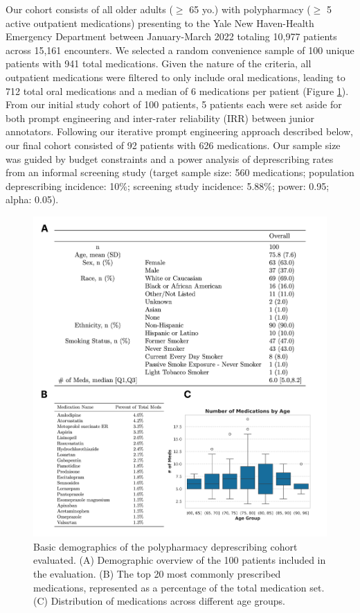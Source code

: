 Our cohort consists of all older adults ($\geq$ 65 yo.) with polypharmacy ($\geq$ 5 active outpatient medications) presenting to the Yale New Haven-Health Emergency Department between January-March 2022 totaling 10,977 patients across 15,161 encounters. We selected a random convenience sample of 100 unique patients with 941 total medications. Given the nature of the criteria, all outpatient medications were filtered to only include oral medications, leading to 712 total oral medications and a median of 6 medications per patient (Figure \ref{fig:aim1-demographics}). From our initial study cohort of 100 patients, 5 patients each were set aside for both prompt engineering and inter-rater reliability (IRR) between junior annotators. Following our iterative prompt engineering approach described below, our final cohort consisted of 92 patients with 626 medications. Our sample size was guided by budget constraints and a power analysis of deprescribing rates from an informal screening study (target sample size: 560 medications; population deprescribing incidence: 10\%\citep{garfinkelWarPolypharmacyNew2007}; screening study incidence: 5.88\%\citep{SAEM24Abstracts2024}; power: 0.95; alpha: 0.05). 

\begin{figure}[!htbp]
	\centering
	\includegraphics[width=1\textwidth] {figures/aim1/combined_fig.png}
	\caption{Basic demographics of the polypharmacy deprescribing cohort evaluated. (A) Demographic overview of the 100 patients included in the evaluation. (B) The top 20 most commonly prescribed medications, represented as a percentage of the total medication set. (C) Distribution of medications across different age groups.} \label{fig:aim1-demographics}
\end{figure}


